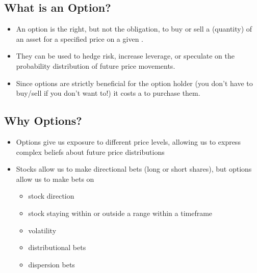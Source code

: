 
\subsection{What is an Option?}%
\label{sub:What is an Option?}

\begin{itemize}
    \item An option is the right, but not the obligation, to buy or sell a  (quantity) of an  asset for a specified  price on a given .
    \item They can be used to hedge risk, increase leverage, or speculate on the probability distribution of future price movements.
    \item Since options are strictly beneficial for the option holder (you don't have to buy/sell if you don't want to!) it costs a  to purchase them.
\end{itemize}

\subsection{Why Options?}%
\label{sub:Why Options?}

\begin{itemize}
    \item Options give us exposure to different price levels, allowing us to express complex beliefs about future price distributions
    \item Stocks allow us to make directional bets (long or short shares), but options allow us to make bets on
        \begin{itemize}
            \item stock direction
            \item stock staying within or outside a range within a timeframe
            \item volatility
            \item distributional bets
            \item dispersion bets
        \end{itemize}
\end{itemize}

